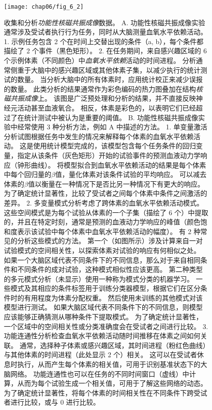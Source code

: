 \begin{figure}[htbp]
	\centering
	\texttt{[image: chap06/fig\_6\_2]}
	\caption{收集和分析\textit{功能性核磁共振成像}数据。
		A. 功能性核磁共振成像实验通常涉及受试者执行行为任务，同时从大脑测量血氧水平依赖活动。
		1. 示例任务包含 2 个在时间上交替出现的条件（a, b），每个条件都描绘了 2 个事件（黑色矩形）。
		2. 在任务期间，来自感兴趣区域的 6 个示例体素（不同颜色）中\textit{血氧水平依赖}活动的时间进程。
		分析通常侧重于大脑中的感兴趣区域或其他体素子集，以减少执行的统计测试的数量。
		当分析大脑中的所有体素时，应用统计校正来减少误报的数量。
		此类分析的结果通常作为彩色编码的热力图叠加在结构\textit{核磁共振成像}上。
		该图是广泛预处理和分析的结果，并不直接反映神经元活动甚至血液氧合。
		相反，体素是彩色的，以表明它们已经超过了在统计测试中被认为是重要的阈值。
		B. 功能性核磁共振成像实验中经常使用 3 种分析方法，例如 A 中描述的方法。
		1. 单变量激活分析试图根据任务中发生的情况来解释每个体素的血氧水平依赖活动。 
		这是使用统计模型完成的，该模型包含每个任务条件的回归变量，指定从该条件（灰色矩形）开始的试验事件的预测血液动力学响应（钟形曲线）。 
		将模型拟合到血氧水平依赖活动的结果是每个体素中每个回归量的$\beta$值，量化体素对该条件试验的平均响应。 
		可以减去体素的$\beta$值以衡量在一种情况下是否比另一种情况下有更大的响应。
		为了确定统计显著性，比较了受试者之间每个体素中条件之间激活的差异。
		2. 多变量模式分析考虑了跨体素的血氧水平依赖活动模式。
		这些空间模式是为每个试验从体素的一个子集（描绘了 6 个）中提取的，并且在特定时刻，通常是预测的血液动力学响应的峰值（颜色饱和度表示该试验中每个体素中血氧水平依赖活动的幅度）。
		有 2 种常见的分析这些模式的方法。
		第一个（如图所示）涉及计算来自一对试验模式的空间相关性，以探索体素对试验的响应有何相似之处。
		如果一个大脑区域代表不同条件下的不同信息，那么对于来自相同条件和不同条件的成对试验，这种模式相似性应该更高。
		第二种类型的多元模式分析（未显示）使用一种称为模式分类的机器学习。
		一些模式及其相应的条件标签用于训练分类器模型，根据它们在区分条件时的有用程度为体素分配权重。
		然后使用未训练的其他模式对该模型进行测试。
		如果大脑区域代表不同条件下的不同信息，则模型应该能够正确猜测从哪种条件下提取模式。
		为了确定统计显著性，一个区域中的空间相关性或分类准确度会在受试者之间进行比较。
		3. 功能连通性分析检查血氧水平依赖活动随时间推移在体素之间如何关联。
		通常，选择种子体素或感兴趣区域，其时间进程（粉红色曲线）与其他体素的时间进程（此处显示 2 个）相关。
		这可以在受试者休息时执行，从而产生每个体素的相关值，可用于识别基准状态下的大脑网络。
		功能连通性也可以在任务的不同时间窗口（虚线）中计算，从而为每个试验生成一个相关值，可用于了解这些网络的动态。
		为了确定统计显著性，将每个体素的时间相关性在不同条件下跨受试者进行比较，或与 0 进行比较。}
	\label{fig:6_2}
\end{figure}

